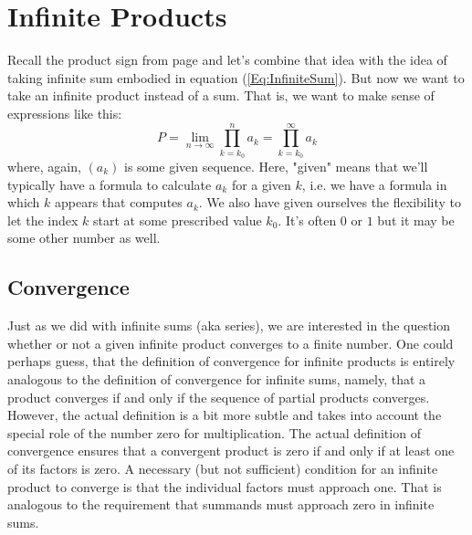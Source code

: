 \section{Infinite Products}
Recall the product sign from page \pageref{Sec:SumsAndProducts} and let's combine that idea with the idea of taking infinite sum embodied in equation (\ref{Eq:InfiniteSum}). But now we want to take an infinite product instead of a sum. That is, we want to make sense of expressions like this:
\begin{equation}
\label{Eq:InfiniteProduct}
P = \lim_{n \rightarrow \infty} \prod_{k=k_0}^n a_k
  = \prod_{k=k_0}^{\infty} a_k
\end{equation}
where, again, $(a_k)$ is some given sequence. Here, "given" means that we'll typically have a formula to calculate $a_k$ for a given $k$, i.e. we have a formula in which $k$ appears that computes $a_k$. We also have given ourselves the flexibility to let the index $k$ start at some prescribed value $k_0$. It's often $0$ or $1$ but it may be some other number as well. 



\subsection{Convergence}
Just as we did with infinite sums (aka series), we are interested in the question whether or not a given infinite product converges to a finite number. One could perhaps guess, that the definition of convergence for infinite products is entirely analogous to the definition of convergence for infinite sums, namely, that a product converges if and only if the sequence of partial products converges. However, the actual definition is a bit more subtle and takes into account the special role of the number zero for multiplication. The actual definition of convergence ensures that a convergent product is zero if and only if at least one of its factors is zero. A necessary (but not sufficient) condition for an infinite product to converge is that the individual factors must approach one. That is analogous to the requirement that summands must approach zero in infinite sums.

